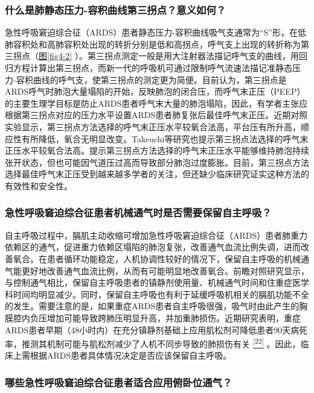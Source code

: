 \subsubsection{什么是肺静态压力-容积曲线第三拐点？意义如何？}

急性呼吸窘迫综合征（ARDS）患者静态压力-容积曲线吸气支通常为“S”形，在低肺容积处和高肺容积处出现的转折分别是低和高拐点，呼气支上出现的转折称为第三拐点（\protect\hyperlink{text00010.htmlux5cux23ck001}{图\ref{fig4-2}}
）。第三拐点测定一般是用大注射器法描记呼气支的曲线，用回归方程计算出第三拐点，而新一代的呼吸机可通过限制呼气流速法描记准静态压力-容积曲线的呼气支，使第三拐点的测定更为简便。目前认为，第三拐点是ARDS呼气时肺泡大量塌陷的开始，反映肺泡的闭合压，而呼气末正压（PEEP）的主要生理学目标是防止ARDS患者呼气末大量的肺泡塌陷，因此，有学者主张应根据第三拐点对应的压力水平设置ARDS患者肺复张后最佳呼气末正压。近期对照实验显示，第三拐点方法选择的呼气末正压水平较氧合法高，平台压有所升高，顺应性有所降低，氧合无明显改变。Takeuchi等研究也提示第三拐点法选择的呼气末正压水平较氧合法高。提示第三拐点方法选择的呼气末正压水平能够维持肺泡持续张开状态，但也可能因气道压过高而导致部分肺泡过度膨胀。目前，第三拐点方法选择最佳呼气末正压受到越来越多学者的关注，但还缺少临床研究证实这种方法的有效性和安全性。

\subsubsection{急性呼吸窘迫综合征患者机械通气时是否需要保留自主呼吸？}

自主呼吸过程中，膈肌主动收缩可增加急性呼吸窘迫综合征（ARDS）患者肺重力依赖区的通气，促进重力依赖区塌陷的肺泡复张，改善通气血流比例失调，进而改善氧合。在患者循环功能稳定，人机协调性较好的情况下，保留自主呼吸的机械通气能更好地改善通气血流比例，从而有可能明显地改善氧合。前瞻对照研究显示，与控制通气相比，保留自主呼吸患者的镇静剂使用量、机械通气时间和住重症医学科时间均明显减少。同时，保留自主呼吸也有利于延缓呼吸机相关的膈肌功能不全的发生。需要注意的是，如果重症ARDS患者自主呼吸很强，吸气时由此产生的胸膜腔内负压增加可能导致跨肺压明显升高，并加重肺损伤。近期研究表明，重症ARDS患者早期（48小时内）在充分镇静剂基础上应用肌松剂可降低患者90天病死率，推测其机制可能与肌松剂减少了人机不同步导致的肺损伤有关
\protect\hyperlink{text00011.htmlux5cux23ch22-10}{\textsuperscript{{[}22{]}}}
。因此，临床上需根据ARDS患者具体情况决定是否应该保留自主呼吸。

\subsubsection{哪些急性呼吸窘迫综合征患者适合应用俯卧位通气？}

